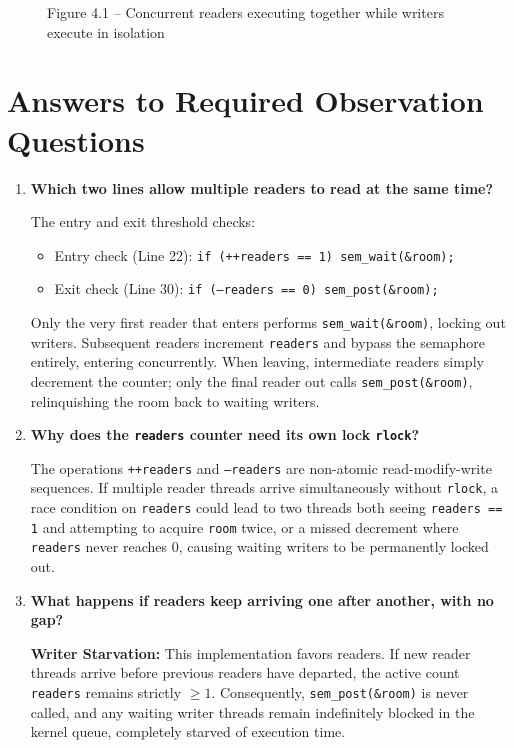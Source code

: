 \documentclass[12pt,a4paper]{report}
\numberwithin{equation}{chapter}
\numberwithin{figure}{chapter}
\numberwithin{table}{chapter}
\begin{document}
\begin{figure}[H]
\centering
\caption{Figure 4.1 -- Concurrent readers executing together while writers execute in isolation}
\end{figure}

\section{Answers to Required Observation Questions}
\begin{enumerate}
    \item \textbf{Which two lines allow multiple readers to read at the same time?}
    
    The entry and exit threshold checks:
    \begin{itemize}
        \item Entry check (Line 22): \texttt{if (++readers == 1) sem\_wait(\&room);}
        \item Exit check (Line 30): \texttt{if (--readers == 0) sem\_post(\&room);}
    \end{itemize}
    Only the very first reader that enters performs \texttt{sem\_wait(\&room)}, locking out writers. Subsequent readers increment \texttt{readers} and bypass the semaphore entirely, entering concurrently. When leaving, intermediate readers simply decrement the counter; only the final reader out calls \texttt{sem\_post(\&room)}, relinquishing the room back to waiting writers.

    \item \textbf{Why does the \texttt{readers} counter need its own lock \texttt{rlock}?}
    
    The operations \texttt{++readers} and \texttt{--readers} are non-atomic read-modify-write sequences. If multiple reader threads arrive simultaneously without \texttt{rlock}, a race condition on \texttt{readers} could lead to two threads both seeing \texttt{readers == 1} and attempting to acquire \texttt{room} twice, or a missed decrement where \texttt{readers} never reaches 0, causing waiting writers to be permanently locked out.

    \item \textbf{What happens if readers keep arriving one after another, with no gap?}
    
    \textbf{Writer Starvation:}
    This implementation favors readers. If new reader threads arrive before previous readers have departed, the active count \texttt{readers} remains strictly $\ge 1$. Consequently, \texttt{sem\_post(\&room)} is never called, and any waiting writer threads remain indefinitely blocked in the kernel queue, completely starved of execution time.
\end{enumerate}
\end{document}
